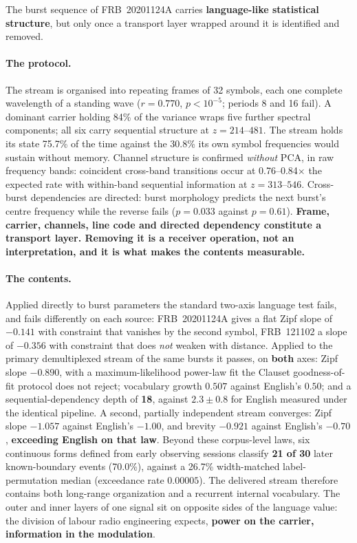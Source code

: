 \documentclass[11pt,a4paper]{article}
\begin{document}
The burst sequence of FRB~20201124A carries \textbf{language-like statistical
structure}, but only once a transport layer wrapped around it is identified and
removed.

\paragraph{The protocol.} The stream is organised into repeating frames of 32 symbols,
each one complete wavelength of a standing wave ($r = 0.770$, $p < 10^{-5}$; periods 8
and 16 fail). A dominant carrier holding 84\% of the variance wraps five further
spectral components; all six carry sequential structure at $z = 214$--$481$. The stream
holds its state 75.7\% of the time against the 30.8\% its own symbol frequencies
would sustain without memory. Channel structure is
confirmed \emph{without} PCA, in raw frequency bands: coincident cross-band transitions
occur at 0.76--0.84$\times$ the expected rate with within-band sequential information at
$z = 313$--$546$. Cross-burst dependencies are directed: burst morphology predicts the
next burst's centre frequency while the reverse fails ($p = 0.033$ against $p = 0.61$).
\textbf{Frame, carrier, channels, line code and directed dependency constitute a
transport layer. Removing it is a receiver operation, not an interpretation, and it is
what makes the contents measurable.}

\paragraph{The contents.} Applied directly to burst parameters the standard two-axis
language test fails, and fails differently on each source: FRB~20201124A gives a flat
Zipf slope of $-0.141$ with constraint that vanishes by the second symbol, FRB~121102 a
slope of $-0.356$ with constraint that does \emph{not} weaken with distance. Applied to
the primary demultiplexed stream of the same bursts it passes, on \textbf{both} axes:
Zipf slope $-0.890$, with a maximum-likelihood power-law fit the Clauset
goodness-of-fit protocol does not reject; vocabulary growth $\mathbf{0.507}$ against
English's $0.50$; and a
sequential-dependency depth of \textbf{18}, against $\mathbf{2.3 \pm 0.8}$ for English
measured under the identical pipeline. A second, partially independent stream
converges: Zipf slope $\mathbf{-1.057}$ against English's $-1.00$, and brevity
$\mathbf{-0.921}$ against English's $-0.70$, \textbf{exceeding English on that law}.
Beyond these corpus-level laws, six continuous forms defined from early observing
sessions classify \textbf{21 of 30} later known-boundary events (70.0\%), against a 26.7\%
width-matched label-permutation median (exceedance rate $0.00005$). The delivered stream therefore
contains both long-range organization and a recurrent internal vocabulary.
The outer and inner layers of one signal sit on opposite sides of the language value:
the division of labour radio engineering expects, \textbf{power on the carrier,
information in the modulation}.
\end{document}
